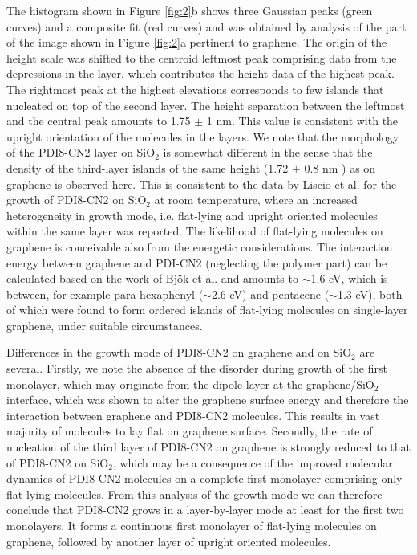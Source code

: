 \documentclass[preprint,aip,jap]{revtex4-2}
\begin{document}
The histogram shown in Figure \ref{fig:2}b shows three Gaussian peaks (green curves) and a composite fit (red curves) and was obtained by analysis of the part of the image shown in Figure \ref{fig:2}a pertinent to graphene.
 The origin of the height scale was shifted to the centroid leftmost peak comprising data from the depressions in the layer, which contributes the height data of the highest peak.
 The rightmost peak at the highest elevations corresponds to few islands that nucleated on top of the second layer.
 The height separation between the leftmost and the central peak amounts to 1.75 $\pm$ 1 nm.
 This value is consistent with the upright orientation of the molecules in the layers.
 We note that the morphology of the PDI8-CN2 layer on SiO$_{2}$ is somewhat different in the sense that the density of the third-layer islands  of the same height (1.72 $\pm$ 0.8 nm ) as on graphene is observed here.
 This is consistent to the data by Liscio et al.
 for the growth of PDI8-CN2 on SiO$_{2}$ at room temperature, where an increased heterogeneity in growth mode, i.e. flat-lying and upright oriented molecules within the same layer was reported.
 The likelihood of flat-lying molecules on graphene is conceivable also from the energetic considerations.
 The interaction energy between graphene and PDI-CN2 (neglecting the polymer part) can be calculated based on the work of Bj\"{o}k et al.
\cite{bjork-2010} and amounts to $\sim$1.6 eV, which is between, for example para-hexaphenyl ($\sim$2.6 eV) and pentacene ($\sim$1.3 eV), both of which were found to form ordered islands of flat-lying molecules on single-layer graphene, under suitable circumstances\cite{kratzer-2016}.


Differences in the growth mode of PDI8-CN2 on graphene and on SiO$_{2}$ are several.
 Firstly, we note the absence of the disorder during growth of the first monolayer, which may originate from the dipole layer at the graphene/SiO$_{2}$ interface, which was shown to alter the graphene surface energy and therefore the interaction between graphene and PDI8-CN2 molecules\cite{sabio-2008,chhikara-2014}.
 This results in vast majority of molecules to lay flat on graphene surface\cite{kratzer-2016}.
  Secondly, the rate of nucleation of the third layer of PDI8-CN2 on graphene is strongly reduced to that of PDI8-CN2 on SiO$_{2}$, which may be a consequence of the improved molecular dynamics of PDI8-CN2 molecules on a complete first monolayer comprising only flat-lying molecules.
   From this analysis of the growth mode we can therefore conclude that PDI8-CN2 grows in a layer-by-layer mode at least for the first two monolayers.
 It forms a continuous first monolayer of flat-lying molecules on graphene, followed by another layer of upright oriented molecules.
\end{document}
